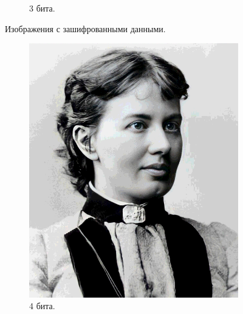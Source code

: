 \documentclass[11pt,a4paper,final]{article} %
\begin{document}
\begin{figure}[h!]
\begin{subfigure}[b]{0.3\linewidth}
		\caption{3 бита.}
		\label{fig:p3}
	\end{subfigure}
	
	\caption{Изображения с зашифрованными данными.}
	\label{fig:encrypted_images_row1}
\end{figure}

\begin{figure}[h!]
	\centering
	
	\begin{subfigure}[b]{0.3\linewidth}
		\centering
		\includegraphics[width=\linewidth]{img/sofya-4-5.png}
		\caption{4 бита.}
		\label{fig:p4}
	\end{subfigure}
	\hfill
	\begin{subfigure}[b]{0.3\linewidth}
		\centering

\end{subfigure}
\end{figure}
\end{document}
